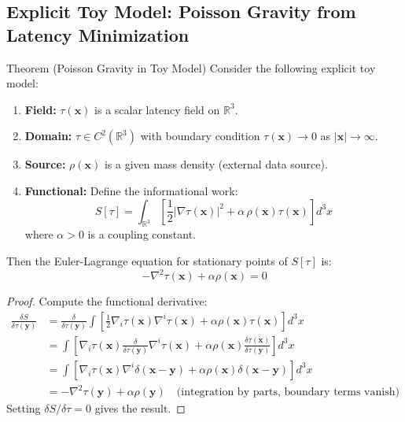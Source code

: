 \documentclass[11pt,titlepage]{article}
\begin{document}

\subsection{Explicit Toy Model: Poisson Gravity from Latency Minimization}

\begin{mytheorem}{Theorem (Poisson Gravity in Toy Model)}
\label{thm:poisson-toy}
Consider the following explicit toy model:
\begin{enumerate}
    \item \textbf{Field:} $\tau(\mathbf{x})$ is a scalar latency field on $\mathbb{R}^3$.
    \item \textbf{Domain:} $\tau \in C^2(\mathbb{R}^3)$ with boundary condition $\tau(\mathbf{x}) \to 0$ as $|\mathbf{x}| \to \infty$.
    \item \textbf{Source:} $\rho(\mathbf{x})$ is a given mass density (external data source).
    \item \textbf{Functional:} Define the informational work:
    \[
    S[\tau] = \int_{\mathbb{R}^3} \left[ \frac{1}{2} |\nabla \tau(\mathbf{x})|^2 + \alpha \, \rho(\mathbf{x}) \tau(\mathbf{x}) \right] d^3x
    \]
    where $\alpha > 0$ is a coupling constant.
\end{enumerate}
Then the Euler-Lagrange equation for stationary points of $S[\tau]$ is:
\[
-\nabla^2 \tau(\mathbf{x}) + \alpha \rho(\mathbf{x}) = 0
\]
\end{mytheorem}

\begin{proof}
Compute the functional derivative:
\begin{align*}
\frac{\delta S}{\delta \tau(\mathbf{y})} 
&= \frac{\delta}{\delta \tau(\mathbf{y})} \int \left[ \frac{1}{2} \nabla_i \tau(\mathbf{x}) \nabla^i \tau(\mathbf{x}) + \alpha \rho(\mathbf{x}) \tau(\mathbf{x}) \right] d^3x \\
&= \int \left[ \nabla_i \tau(\mathbf{x}) \frac{\delta}{\delta \tau(\mathbf{y})} \nabla^i \tau(\mathbf{x}) + \alpha \rho(\mathbf{x}) \frac{\delta \tau(\mathbf{x})}{\delta \tau(\mathbf{y})} \right] d^3x \\
&= \int \left[ \nabla_i \tau(\mathbf{x}) \nabla^i \delta(\mathbf{x} - \mathbf{y}) + \alpha \rho(\mathbf{x}) \delta(\mathbf{x} - \mathbf{y}) \right] d^3x \\
&= -\nabla^2 \tau(\mathbf{y}) + \alpha \rho(\mathbf{y}) \quad \text{(integration by parts, boundary terms vanish)}
\end{align*}
Setting $\delta S/\delta \tau = 0$ gives the result.
\end{proof}
\end{document}
